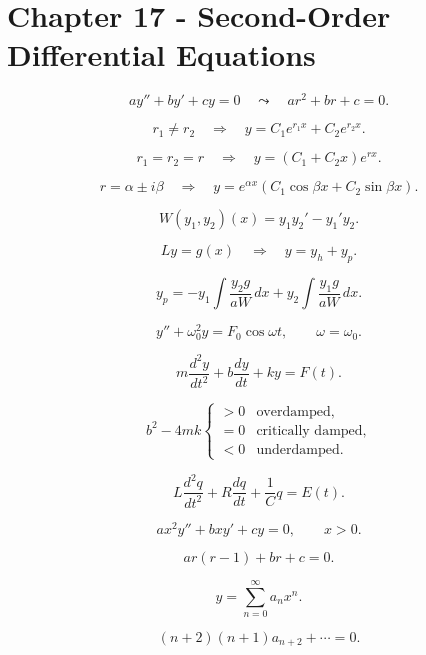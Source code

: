 
\section*{Chapter 17 - Second-Order Differential Equations}

\[
  ay''+by'+cy=0
  \quad\leadsto\quad
  ar^2+br+c=0.
\]

\[
  r_1\ne r_2
  \quad\Longrightarrow\quad
  y=C_1e^{r_1x}+C_2e^{r_2x}.
\]

\[
  r_1=r_2=r
  \quad\Longrightarrow\quad
  y=(C_1+C_2x)e^{rx}.
\]

\[
  r=\alpha\pm i\beta
  \quad\Longrightarrow\quad
  y=e^{\alpha x}\left(C_1\cos\beta x+C_2\sin\beta x\right).
\]

\[
  W(y_1,y_2)(x)=y_1y_2'-y_1'y_2.
\]

\[
  Ly=g(x)
  \quad\Longrightarrow\quad
  y=y_h+y_p.
\]

\[
  y_p
  =
  -y_1\int\frac{y_2g}{aW}\,dx
  +
  y_2\int\frac{y_1g}{aW}\,dx.
\]

\[
  y''+\omega_0^2y=F_0\cos\omega t,
  \qquad
  \omega=\omega_0.
\]

\[
  m\frac{d^2y}{dt^2}
  +
  b\frac{dy}{dt}
  +
  ky
  =
  F(t).
\]

\[
  b^2-4mk
  \begin{cases}
    >0 & \text{overdamped},\\
    =0 & \text{critically damped},\\
    <0 & \text{underdamped}.
  \end{cases}
\]

\[
  L\frac{d^2q}{dt^2}
  +
  R\frac{dq}{dt}
  +
  \frac1Cq
  =
  E(t).
\]

\[
  ax^2y''+bxy'+cy=0,
  \qquad x>0.
\]

\[
  ar(r-1)+br+c=0.
\]

\[
  y=\sum_{n=0}^{\infty}a_nx^n.
\]

\[
  (n+2)(n+1)a_{n+2}+\cdots=0.
\]
